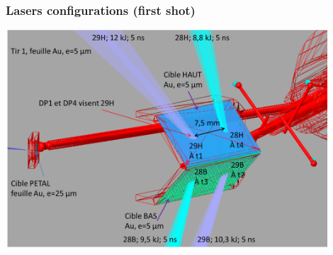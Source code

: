 \documentclass{beamer}
\begin{document}
\begin{frame}
\frametitle{Lasers configurations (first shot)}

\begin{center}
\includegraphics[width=0.9\textwidth]{tir1.png}
\end{center}

\end{frame}
\end{document}
